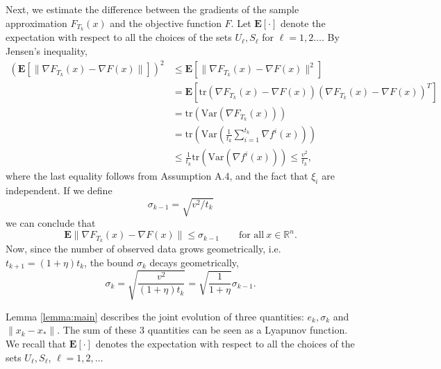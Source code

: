 \documentclass[11pt]{article}
\newcommand{\Var}{\mathrm{Var}}
\newcommand{\E}{\mathbf{E}}
\begin{document}
Next, we estimate the difference between the gradients of the sample approximation $F_{T_k}(x)$  and the objective function $F$.  Let $\E [\cdot]$ denote the expectation with respect to all the choices of the sets $U_\ell, S_\ell$ for $\ell=1, 2 \ldots$.
By Jensen's inequality,
\begin{align*}
 (\E [\|\nabla F_{T_k}(x) - \nabla F(x)\| ])^2 & \leq \E [ \|\nabla F_{T_k}(x) - \nabla F(x)\|^2 ]\\
  & = \E[\mbox{tr}(\nabla F_{T_k}(x) - \nabla F(x))(\nabla F_{T_k}(x) - \nabla F(x))^T]\\
  & = \mbox{tr}(\Var (\nabla F_{T_k}(x) )) \\
  & = \mbox{tr}\left(\Var \left(\frac{1}{t_{k}}\sum_{i=1}^{t_k} \nabla f^i(x)\right) \right) \\
  & \leq \frac{1}{t_k}\mbox{tr}(\Var(\nabla f^i(x)))   \leq \frac{v^2}{t_k} ,
\end{align*}
where the last equality follows from Assumption A.4, and the fact that $\xi_i$ are independent.
If we define
\begin{equation}   \label{sigmad}
 \sigma_{k-1} = \sqrt{{v^2}/{t_k}}
 \end{equation}
 we can conclude that
\begin{equation}\label{eq:var}
 \E \|\nabla F_{T_k}(x) - \nabla F(x)\| \leq \sigma_{k-1} \qquad\mbox{for all} \ x \in \mathbb{R}^n.
\end{equation}
Now, since the number of observed data grows geometrically,  i.e. $t_{k+1} = (1+\eta)t_k$, the bound $\sigma_k$ decays geometrically,
\begin{equation}\label{eq:sigma}
 \sigma_k =\sqrt{\frac{v^2}{(1+\eta)t_k}} = \sqrt{ \frac{1}{1+\eta}} \sigma_{k-1}.
\end{equation}


 
Lemma \ref{lemma:main} describes the joint evolution of three quantities:  $e_k, \sigma_k$ and  $ \| x_k - x_*\|$. The sum of these 3 quantities can be seen as a Lyapunov function. We recall that  $\E [\cdot]$ denotes the expectation with respect to all the choices of  the sets $U_\ell, S_\ell$, $\ell = 1, 2, \ldots $ 
\end{document}
